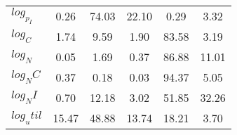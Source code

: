 \begin{center}
\begin{longtable}{lccccc}
$log_p_I   $	 & 	        0.26	 & 	       74.03	 & 	       22.10	 & 	        0.29	 & 	        3.32 \\ 
$log_C     $	 & 	        1.74	 & 	        9.59	 & 	        1.90	 & 	       83.58	 & 	        3.19 \\ 
$log_N     $	 & 	        0.05	 & 	        1.69	 & 	        0.37	 & 	       86.88	 & 	       11.01 \\ 
$log_NC    $	 & 	        0.37	 & 	        0.18	 & 	        0.03	 & 	       94.37	 & 	        5.05 \\ 
$log_NI    $	 & 	        0.70	 & 	       12.18	 & 	        3.02	 & 	       51.85	 & 	       32.26 \\ 
$log_util  $	 & 	       15.47	 & 	       48.88	 & 	       13.74	 & 	       18.21	 & 	        3.70 \\ 
\end{longtable}
 \end{center}
